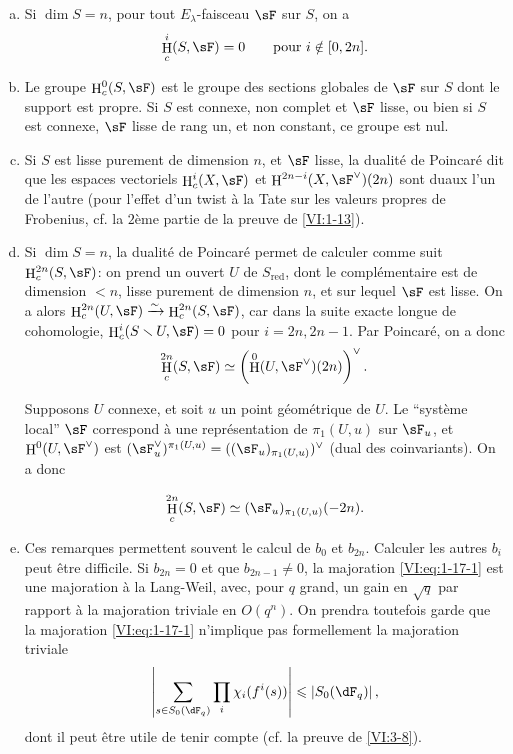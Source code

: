 \documentclass[oneside]{book}
\DeclareMathOperator{\h}{H}
\newcommand{\iso}{\xrightarrow\sim}
\renewcommand{\setminus}{\smallsetminus}
\theoremstyle{sga-source}
\theoremstyle{sga-source-dash}
\theoremstyle{sga-source-dotdash}
\theoremstyle{sga-source-number-note-dash}
\theoremstyle{sga-source-note-number-dotdash}
\theoremstyle{sga-source-example-dotdash}
\theoremstyle{sga-source-inline-number}
\theoremstyle{sga-source-bare-number}
\theoremstyle{sga-source}
\newcommand{\PrintPage}[1]{}\newcommand{\MathPage}[1]{}\newcommand{\PrintCite}[2]{#1}\newcommand{\var}[3]{#1}
\begin{document}
\begin{enumerate}[a)]
  \item Si $\dim S=n$, pour tout $E_\lambda$-faisceau $\sF$ sur $S$, on a 
    \[
      \h_c^i(S,\sF) = 0 \qquad \text{pour $i\notin [0,2n]$.}
    \]
  \item Le groupe $\h_c^0(S,\sF)$ est le groupe des sections globales de $\sF$ 
    sur $S$ dont le support est propre. Si $S$ est connexe, non complet et 
    $\sF$ lisse, ou bien si $S$ est connexe, $\sF$ lisse de rang un, et non 
    constant, ce groupe est nul.
  \item Si $S$ est lisse purement de dimension $n$, et $\sF$ lisse, la 
    dualité de Poincaré dit que les espaces vectoriels 
    \var{$\h_c^i(X,\sF)$ et $\h^{2n-i}(X,\sF^\vee)(2n)$}{$\h_c^i(S,\sF)$ et $\h^{2n-i}(S,\sF^\vee)(n)$}{S45-SOL-0707} sont duaux l'un de l'autre 
    (pour l'effet d'un twist à la Tate sur les valeurs propres de Frobenius, 
    cf. la $2$ème partie de la preuve de \ref{VI:1-13}).
  \item Si $\dim S=n$, la dualité de Poincaré permet de calculer comme 
    suit $\h_c^{2n}(S,\sF)$: on prend un ouvert $U$ de $S_\text{red}$, dont le 
    complémentaire est de dimension $<n$, lisse purement de dimension $n$, et 
    sur lequel $\sF$ est lisse. On a alors 
    $\h_c^{2n}(U,\sF) \iso \h_c^{2n}(S,\sF)$, car dans la suite exacte longue 
    de cohomologie, $\h_c^i(S\setminus U,\sF) = 0$ pour $i=2n,2n-1$. Par 
    Poincaré, on a donc 
    \[
      \h_c^{2n}(S,\sF) \simeq \left(\var{\h^0(U,\sF^\vee)(2n)}{\h^0(U,\sF^\vee)(n)}{S45-SOL-0710}\right)^\vee \text{.}
    \]
    
    Supposons $U$ connexe, et soit $u$ un point géométrique de $U$. Le 
    ``système local'' $\sF$ correspond à une représentation de 
    $\pi_1(U,u)$ sur $\sF_u$, et $\h^0(U,\sF^\vee)$ est 
    $(\sF_u^\vee)^{\pi_1(U,u)}=((\sF_u)_{\pi_1(U,u)})^\vee$ (dual des 
    coinvariants). On a donc 
    \PrintPage{179}
\[
      \h_c^{2n}(S,\sF) \simeq \var{(\sF_u)_{\pi_1(U,u)}(-2n)}{(\sF_u)_{\pi_1(U,u)}(-n)}{S45-SOL-0711} \text{.}
    \]
  \item Ces remarques permettent souvent le calcul de $b_0$ et $b_{2n}$. 
    Calculer les autres $b_i$ peut être difficile. Si $b_{2n}=0$ et que 
    $b_{2n-1}\ne 0$, la majoration \eqref{VI:eq:1-17-1} est une majoration à la 
    Lang-Weil, avec, pour $q$ grand, un gain en $\sqrt q$ par rapport à la 
    majoration triviale en $O(q^n)$. On prendra toutefois garde que la 
    majoration \eqref{VI:eq:1-17-1} n'implique pas formellement la majoration 
    triviale 
    \[
      \left|\sum_{s\in S_0(\dF_q)} \prod_i \chi_i(f^i(s))\right| \leqslant \left| S_0(\dF_q)\right| \text{,}
    \]
    dont il peut être utile de tenir compte (cf. la preuve de \ref{VI:3-8}). 
\end{enumerate}
\end{document}
